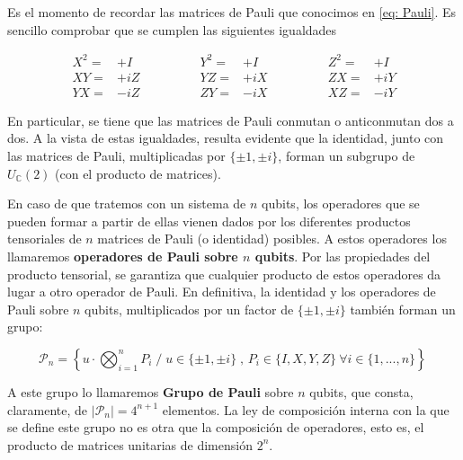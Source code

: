 \documentclass[11pt,a4paper,twoside,pdf]{article}
\numberwithin{equation}{section}
\begin{document}
		Es el momento de recordar las matrices de Pauli que conocimos en \ref{eq: Pauli}. Es sencillo comprobar que se cumplen las siguientes igualdades
	
			\begin{equation} \label{eq: Pauli igualdades}
				\begin{aligned} X^2 = & +I \\ XY = & +iZ \\  YX = & -iZ \end{aligned}
													\qquad \qquad		
				\begin{aligned} Y^2 = & +I \\ YZ = & +iX \\  ZY = & -iX \end{aligned}
													\qquad \qquad
				\begin{aligned} Z^2 = & +I \\ ZX = & +iY \\  XZ = & -iY \end{aligned}
			\end{equation}
	
		En particular, se tiene que las matrices de Pauli conmutan o anticonmutan dos a dos. A la vista de estas igualdades, resulta evidente que la identidad, junto con las matrices de Pauli, multiplicadas por $\{\pm1,\pm i\}$, forman un subgrupo de $U_\mathbb{C}(2)$ (con el producto de matrices).
	
		En caso de que tratemos con un sistema de $n$ qubits, los operadores que se pueden formar a partir de ellas vienen dados por los diferentes productos tensoriales de $n$ matrices de Pauli (o identidad) posibles. A estos operadores los llamaremos \textbf{operadores de Pauli sobre $n$  qubits}. Por las propiedades del producto tensorial, se garantiza que cualquier producto de estos operadores da lugar a otro operador de Pauli. En definitiva, la identidad y los operadores de Pauli sobre $n$ qubits, multiplicados por un factor de $\{\pm 1,\pm i\}$  también forman un grupo:
	
			\begin{equation} \label{eq: Grupo de Pauli}
				\mathcal{P}_n = \left\{ u \cdot \displaystyle\bigotimes_{i=1}^{n} P_i 		\; / \;
				u\in\{\pm1,\pm i\} \; , \,	P_i \in \{I,X,Y,Z\}  \ \forall i \in \{1,...,n\} \right\}		\,
			\end{equation}
		
		A este grupo lo llamaremos \textbf{Grupo de Pauli} sobre $n$ qubits, que consta, claramente, de $|\mathcal{P}_n|=4^{n+1}$ elementos. La ley de composición interna con la que se define este grupo no es otra que la composición de operadores, esto es, el producto de matrices unitarias de dimensión $2^n$.
	
\end{document}
